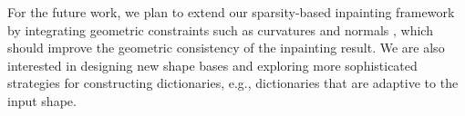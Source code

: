 For the future work, we plan to extend our sparsity-based inpainting framework by integrating geometric constraints such as curvatures and normals
, which should improve the geometric consistency of the inpainting result. We are also interested in designing new shape bases and exploring
more sophisticated strategies for constructing dictionaries, e.g., dictionaries that are adaptive to the input shape. 
